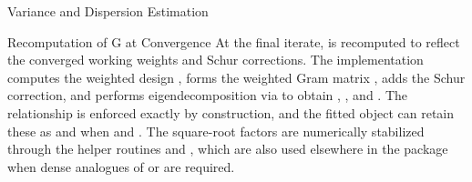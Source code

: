 \begin{Section}{Variance and Dispersion Estimation}
%
\begin{SubSection}{Recomputation of G at Convergence}
At the final iterate,  is recomputed to reflect the
converged working weights and Schur corrections. The implementation
computes the weighted design
,
forms the weighted Gram matrix
, adds the Schur
correction, and performs eigendecomposition via
 to obtain ,
, and . The relationship
 is
enforced exactly by construction, and the fitted object can retain these as
 and  when  and
. The square-root factors are numerically
stabilized through the helper routines  and
, which are also used elsewhere in the package when
dense analogues of  or  are
required.
\end{SubSection}

\end{Section}
%
